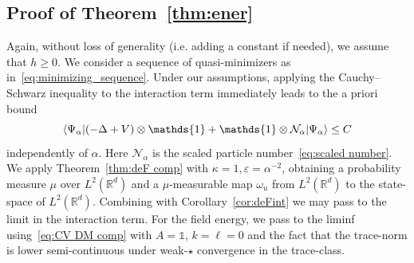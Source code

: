 \documentclass[AHL,Unicode,longabstracts,published]{cedram}
\newcommand{\R}{\mathbb{R}}
\newcommand{\cN}{\mathcal{N}}
\newcommand{\1}{\mathds{1}}
\newcommand{\eps}{\varepsilon}
\let\originalleft\left
\let\originalright\right
\renewcommand{\left}{\mathopen{}\mathclose\bgroup\originalleft}
\renewcommand{\right}{\aftergroup\egroup\originalright}
\begin{document}
\subsection{Proof of Theorem~\ref{thm:ener}}

Again, without loss of generality (i.e. adding a constant if needed), we assume that $h\geq 0$. We consider a sequence of quasi-minimizers as in~\eqref{eq:minimizing_sequence}. Under our assumptions, applying the Cauchy--Schwarz inequality to the interaction term immediately leads to the a priori bound
\begin{equation}\label{eq:apriori}
\left\langle\Psi_\alpha\left| \left(- \Delta + V \right) \otimes \1 + \1 \otimes \cN_\alpha \right| \Psi_\alpha \right\rangle \leq C
\end{equation}
independently of $\alpha$. Here $\cN_\alpha$ is the scaled particle number~\eqref{eq:scaled number}. We apply Theorem~\ref{thm:deF comp} with $\kappa = 1, \eps = \alpha^{-2}$, obtaining a probability measure $\mu$ over $L^2 (\R^d)$ and a $\mu$-measurable map $\omega_u$ from $L^2 (\R^d)$ to the state-space of $L^2 (\R^d)$. Combining with Corollary~\ref{cor:deFint} we may pass to the limit in the interaction term. For the field energy, we pass to the liminf using~\eqref{eq:CV DM comp} with $A=\1$, $k=\ell = 0$ and the fact that the trace-norm is lower semi-continuous under weak-$\star$ convergence in the trace-class.
\end{document}

